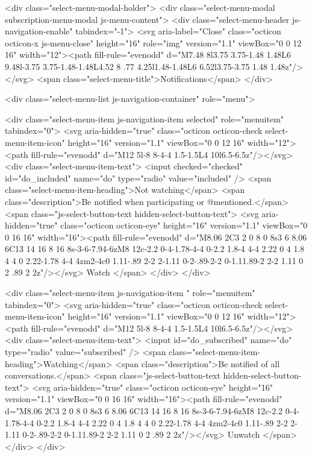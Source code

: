         <div class="select-menu-modal-holder">
          <div class="select-menu-modal subscription-menu-modal js-menu-content">
            <div class="select-menu-header js-navigation-enable" tabindex="-1">
              <svg aria-label="Close" class="octicon octicon-x js-menu-close" height="16" role="img" version="1.1" viewBox="0 0 12 16" width="12"><path fill-rule="evenodd" d="M7.48 8l3.75 3.75-1.48 1.48L6 9.48l-3.75 3.75-1.48-1.48L4.52 8 .77 4.25l1.48-1.48L6 6.52l3.75-3.75 1.48 1.48z"/></svg>
              <span class="select-menu-title">Notifications</span>
            </div>

              <div class="select-menu-list js-navigation-container" role="menu">

                <div class="select-menu-item js-navigation-item selected" role="menuitem" tabindex="0">
                  <svg aria-hidden="true" class="octicon octicon-check select-menu-item-icon" height="16" version="1.1" viewBox="0 0 12 16" width="12"><path fill-rule="evenodd" d="M12 5l-8 8-4-4 1.5-1.5L4 10l6.5-6.5z"/></svg>
                  <div class="select-menu-item-text">
                    <input checked="checked" id="do_included" name="do" type="radio" value="included" />
                    <span class="select-menu-item-heading">Not watching</span>
                    <span class="description">Be notified when participating or @mentioned.</span>
                    <span class="js-select-button-text hidden-select-button-text">
                      <svg aria-hidden="true" class="octicon octicon-eye" height="16" version="1.1" viewBox="0 0 16 16" width="16"><path fill-rule="evenodd" d="M8.06 2C3 2 0 8 0 8s3 6 8.06 6C13 14 16 8 16 8s-3-6-7.94-6zM8 12c-2.2 0-4-1.78-4-4 0-2.2 1.8-4 4-4 2.22 0 4 1.8 4 4 0 2.22-1.78 4-4 4zm2-4c0 1.11-.89 2-2 2-1.11 0-2-.89-2-2 0-1.11.89-2 2-2 1.11 0 2 .89 2 2z"/></svg>
                      Watch
                    </span>
                  </div>
                </div>

                <div class="select-menu-item js-navigation-item " role="menuitem" tabindex="0">
                  <svg aria-hidden="true" class="octicon octicon-check select-menu-item-icon" height="16" version="1.1" viewBox="0 0 12 16" width="12"><path fill-rule="evenodd" d="M12 5l-8 8-4-4 1.5-1.5L4 10l6.5-6.5z"/></svg>
                  <div class="select-menu-item-text">
                    <input id="do_subscribed" name="do" type="radio" value="subscribed" />
                    <span class="select-menu-item-heading">Watching</span>
                    <span class="description">Be notified of all conversations.</span>
                    <span class="js-select-button-text hidden-select-button-text">
                      <svg aria-hidden="true" class="octicon octicon-eye" height="16" version="1.1" viewBox="0 0 16 16" width="16"><path fill-rule="evenodd" d="M8.06 2C3 2 0 8 0 8s3 6 8.06 6C13 14 16 8 16 8s-3-6-7.94-6zM8 12c-2.2 0-4-1.78-4-4 0-2.2 1.8-4 4-4 2.22 0 4 1.8 4 4 0 2.22-1.78 4-4 4zm2-4c0 1.11-.89 2-2 2-1.11 0-2-.89-2-2 0-1.11.89-2 2-2 1.11 0 2 .89 2 2z"/></svg>
                        Unwatch
                    </span>
                  </div>
                </div>

